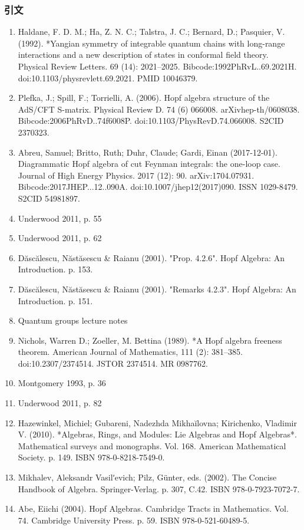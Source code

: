 \subsubsection{引文}
\begin{enumerate}
\item Haldane, F. D. M.; Ha, Z. N. C.; Talstra, J. C.; Bernard, D.; Pasquier, V. (1992). *Yangian symmetry of integrable quantum chains with long-range interactions and a new description of states in conformal field theory. Physical Review Letters. 69 (14): 2021–2025. Bibcode:1992PhRvL..69.2021H. doi:10.1103/physrevlett.69.2021. PMID 10046379.
\item Plefka, J.; Spill, F.; Torrielli, A. (2006). Hopf algebra structure of the AdS/CFT S-matrix. Physical Review D. 74 (6) 066008. arXiv\:hep-th/0608038. Bibcode:2006PhRvD..74f6008P. doi:10.1103/PhysRevD.74.066008. S2CID 2370323.
\item Abreu, Samuel; Britto, Ruth; Duhr, Claude; Gardi, Einan (2017-12-01). Diagrammatic Hopf algebra of cut Feynman integrals: the one-loop case. Journal of High Energy Physics. 2017 (12): 90. arXiv:1704.07931. Bibcode:2017JHEP...12..090A. doi:10.1007/jhep12(2017)090. ISSN 1029-8479. S2CID 54981897.
\item Underwood 2011, p. 55
\item Underwood 2011, p. 62
\item Dăscălescu, Năstăsescu & Raianu (2001). "Prop. 4.2.6". Hopf Algebra: An Introduction. p. 153.
\item Dăscălescu, Năstăsescu & Raianu (2001). "Remarks 4.2.3". Hopf Algebra: An Introduction. p. 151.
\item Quantum groups lecture notes
\item Nichols, Warren D.; Zoeller, M. Bettina (1989). *A Hopf algebra freeness theorem. American Journal of Mathematics, 111 (2): 381–385. doi:10.2307/2374514. JSTOR 2374514. MR 0987762.
\item Montgomery 1993, p. 36
\item Underwood 2011, p. 82
\item Hazewinkel, Michiel; Gubareni, Nadezhda Mikhaĭlovna; Kirichenko, Vladimir V. (2010). *Algebras, Rings, and Modules: Lie Algebras and Hopf Algebras*. Mathematical surveys and monographs. Vol. 168. American Mathematical Society. p. 149. ISBN 978-0-8218-7549-0.
\item Mikhalev, Aleksandr Vasilʹevich; Pilz, Günter, eds. (2002). The Concise Handbook of Algebra. Springer-Verlag. p. 307, C.42. ISBN 978-0-7923-7072-7.
\item Abe, Eiichi (2004). Hopf Algebras. Cambridge Tracts in Mathematics. Vol. 74. Cambridge University Press. p. 59. ISBN 978-0-521-60489-5.

\end{enumerate}

